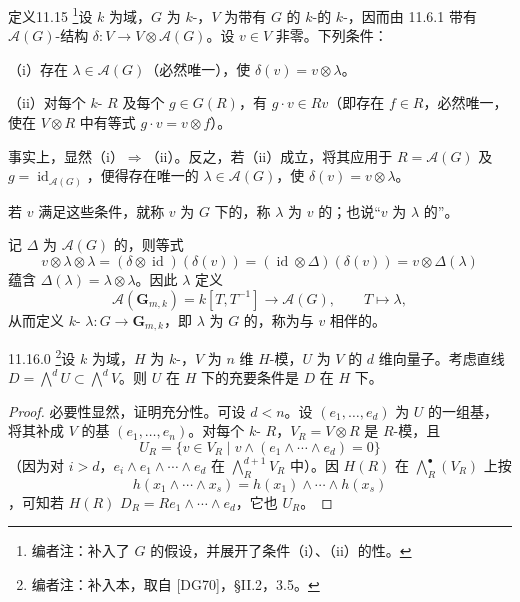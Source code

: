 \begin{SGAresult}{定义}{11.15}
\footnote{编者注：补入了 $G$ 的假设，并展开了条件（i）、（ii）的性。}设 $k$ 为域，$G$ 为 $k$-，$V$ 为带有 $G$ 的 $k$-的 $k$-，因而由 11.6.1 带有 $\mathcal A(G)$-结构 $\delta:V\to V\otimes\mathcal A(G)$。设 $v\in V$ 非零。下列条件：

（i）存在 $\lambda\in\mathcal A(G)$（必然唯一），使 $\delta(v)=v\otimes\lambda$。

（ii）对每个 $k$- $R$ 及每个 $g\in G(R)$，有 $g\cdot v\in Rv$（即存在 $f\in R$，必然唯一，使在 $V\otimes R$ 中有等式 $g\cdot v=v\otimes f$）。

事实上，显然（i）$\Rightarrow$（ii）。反之，若（ii）成立，将其应用于 $R=\mathcal A(G)$ 及 $g=\operatorname{id}_{\mathcal A(G)}$，便得存在唯一的 $\lambda\in\mathcal A(G)$，使 $\delta(v)=v\otimes\lambda$。

若 $v$ 满足这些条件，就称 $v$ 为 $G$ 下的，称 $\lambda$ 为 $v$ 的；也说“$v$ 为 $\lambda$ 的”。
\end{SGAresult}
记 $\Delta$ 为 $\mathcal A(G)$ 的，则等式
\[
v\otimes\lambda\otimes\lambda=(\delta\otimes\operatorname{id})(\delta(v))
=(\operatorname{id}\otimes\Delta)(\delta(v))=v\otimes\Delta(\lambda)
\]
蕴含 $\Delta(\lambda)=\lambda\otimes\lambda$。因此 $\lambda$ 定义
\[
\mathcal A(\mathbf G_{m,k})=k[T,T^{-1}]\longrightarrow\mathcal A(G),\qquad T\longmapsto\lambda,
\]
从而定义 $k$- $\lambda:G\to\mathbf G_{m,k}$，即 $\lambda$ 为 $G$ 的，称为与 $v$ 相伴的。

\begin{SGAresult}{}{11.16.0}
\footnote{编者注：补入本，取自 [DG70]，§II.2，3.5。}设 $k$ 为域，$H$ 为 $k$-，$V$ 为 $n$ 维 $H$-模，$U$ 为 $V$ 的 $d$ 维向量子。考虑直线 $D=\bigwedge^d U\subset\bigwedge^d V$。则 $U$ 在 $H$ 下的充要条件是 $D$ 在 $H$ 下。
\end{SGAresult}
\begin{proof}
必要性显然，证明充分性。可设 $d<n$。设 $(e_1,\ldots,e_d)$ 为 $U$ 的一组基，将其补成 $V$ 的基 $(e_1,\ldots,e_n)$。对每个 $k$- $R$，$V_R=V\otimes R$ 是 $R$-模，且
\[
U_R=\{v\in V_R\mid v\wedge(e_1\wedge\cdots\wedge e_d)=0\}
\]
（因为对 $i>d$，$e_i\wedge e_1\wedge\cdots\wedge e_d$ 在 $\bigwedge_R^{d+1}V_R$ 中）。因 $H(R)$ 在 $\bigwedge_R^\bullet(V_R)$ 上按
\[
h(x_1\wedge\cdots\wedge x_s)=h(x_1)\wedge\cdots\wedge h(x_s)
\]
，可知若 $H(R)$  $D_R=Re_1\wedge\cdots\wedge e_d$，它也 $U_R$。
\end{proof}

